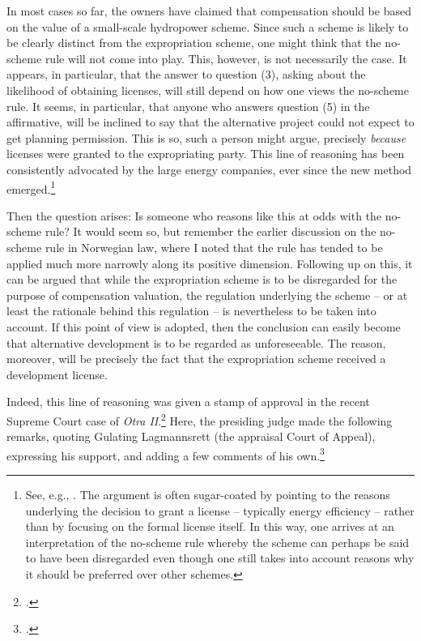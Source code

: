 In most cases so far, the owners have claimed that compensation should be based on the value of a small-scale hydropower scheme. Since such a scheme is likely to be clearly distinct from the expropriation scheme, one might think that the no-scheme rule will not come into play. This, however, is not necessarily the case. It appears, in particular, that the answer to question (3), asking about the likelihood of obtaining licenses, will still depend on how one views the no-scheme rule. It seems, in particular, that anyone who answers question (5) in the affirmative, will be inclined to say that the alternative project could not expect to get planning permission. This is so, such a person might argue, precisely \emph{because} licenses were granted to the expropriating party. This line of reasoning has been consistently advocated by the large energy companies, ever since the new method emerged.\footnote{See, e.g., \cite{kløvtveit11,otra11,otra13}. The argument is often sugar-coated by pointing to the reasons underlying the decision to grant a license -- typically energy efficiency -- rather than by focusing on the formal license itself. In this way, one arrives at an interpretation of the no-scheme rule whereby the scheme can perhaps be said to have been disregarded even though one still takes into account reasons why it should be preferred over other schemes.}

Then the question arises: Is someone who reasons like this at odds with the no-scheme rule? It would seem so, but remember the earlier discussion on the no-scheme rule in Norwegian law, where I noted that the rule has tended to be applied much more narrowly along its positive dimension. Following up on this, it can be argued that while the expropriation scheme is to be disregarded for the purpose of compensation valuation, the regulation underlying the scheme -- or at least the rationale behind this regulation -- is nevertheless to be taken into account. If this point of view is adopted, then the conclusion can easily become that alternative development is to be regarded as unforeseeable. The reason, moreover, will be precisely the fact that the expropriation scheme received a development license. 

Indeed, this line of reasoning was given a stamp of approval in the recent Supreme Court case of \emph{Otra II}.\footcite{otra13} Here, the presiding judge made the following remarks, quoting Gulating Lagmannsrett (the appraisal Court of Appeal), expressing his support, and adding a few comments of his own.\footcite[]{otra13}

